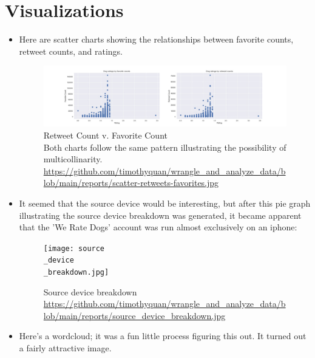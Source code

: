 \documentclass[10pt,a4paper]{article}
\begin{document}
    \section{Visualizations}
        \begin{itemize}
            \item Here are scatter charts showing the relationships between favorite counts, retweet counts, and ratings.
                \begin{figure}[h]
                    \centering
                    \includegraphics[width=1\textwidth]{scatter-retweets-favorites.jpg}            
                    \caption{Retweet Count v. Favorite Count \\ Both charts follow the same pattern illustrating the possibility of
                    multicollinarity.\\\url{https://github.com/timothyquan/wrangle_and_analyze_data/blob/main/reports/scatter-retweets-favorites.jpg} }            
                \end{figure}
            \item It seemed that the source device would be interesting, but after this pie graph illustrating the source device breakdown was generated,
            it became apparent that the 'We Rate Dogs' account was run almost exclusively on an iphone: 
                \begin{figure}[h]
                    \centering
                    \texttt{[image: source\\\_device\\\_breakdown.jpg]}      
                    \caption{Source device breakdown \\\url{https://github.com/timothyquan/wrangle_and_analyze_data/blob/main/reports/source_device_breakdown.jpg} }            
                \end{figure} 
            \item Here's a wordcloud; it was a fun little process figuring this out. It turned out a fairly attractive image. \\ \\ \\ \\ \\ \\ \\ \\ \\ \\ 

\end{itemize}
\end{document}
